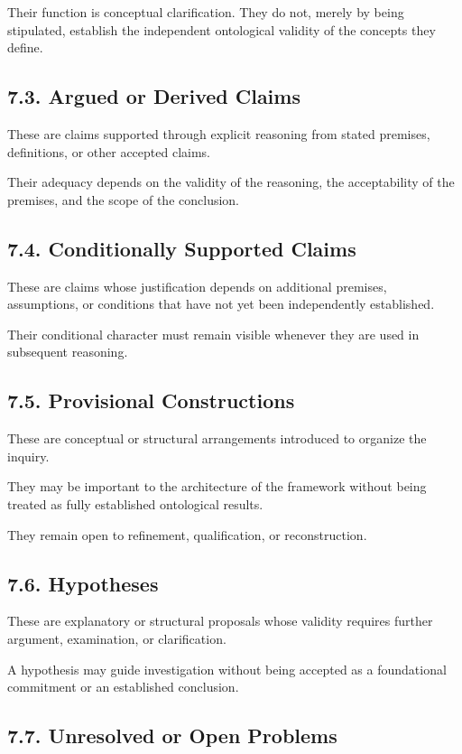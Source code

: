 Their function is conceptual clarification.
They do not, merely by being stipulated,
establish the independent ontological
validity of the concepts they define.

\subsection*{7.3. Argued or Derived Claims}

These are claims supported through
explicit reasoning from stated premises,
definitions, or other accepted claims.

Their adequacy depends on the validity
of the reasoning, the acceptability of
the premises, and the scope of the
conclusion.

\subsection*{7.4. Conditionally Supported Claims}

These are claims whose justification
depends on additional premises,
assumptions, or conditions that have
not yet been independently established.

Their conditional character must remain
visible whenever they are used in
subsequent reasoning.

\subsection*{7.5. Provisional Constructions}

These are conceptual or structural
arrangements introduced to organize
the inquiry.

They may be important to the architecture
of the framework without being treated
as fully established ontological results.

They remain open to refinement,
qualification, or reconstruction.

\subsection*{7.6. Hypotheses}

These are explanatory or structural
proposals whose validity requires
further argument, examination, or
clarification.

A hypothesis may guide investigation
without being accepted as a foundational
commitment or an established conclusion.

\subsection*{7.7. Unresolved or Open Problems}

